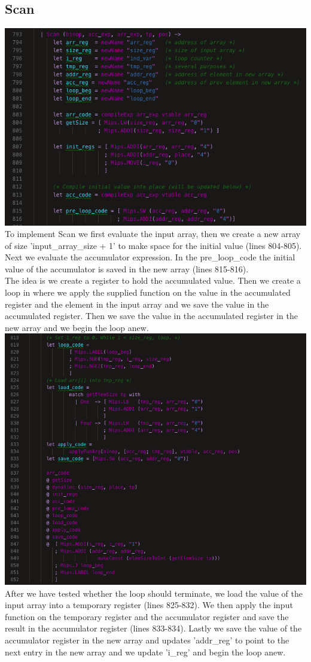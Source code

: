 \subsection{Scan}
\includegraphics[width=\linewidth]{Materials/CodeGen/Scan1}
To implement Scan we first evaluate the input array, then we create a new array of size 'input\_array\_size + 1' to make space for the initial value (lines 804-805). Next we evaluate the accumulator expression. In the pre\_loop\_code the initial value of the accumulator is saved in the new array (lines 815-816).\\
The idea is we create a register to hold the accumulated value. Then we create a loop in where we apply the supplied function on the value in the accumulated register and the element in the input array and we save the value in the accumulated register. Then we save the value in the accumulated register in the new array and we begin the loop anew.
\includegraphics[width=\linewidth]{Materials/CodeGen/Scan2}
After we have tested whether the loop should terminate, we load the value of the input array into a temporary register (lines 825-832). We then apply the input function on the temporary register and the accumulator register and save the result in the accumulator register (lines 833-834). Lastly we save the value of the accumulator register in the new array and updates 'addr\_reg' to point to the next entry in the new array and we update 'i\_reg' and begin the loop anew.